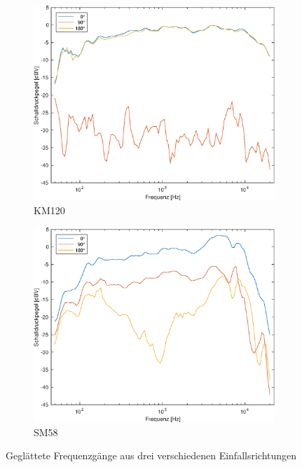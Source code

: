 \begin{figure}[bth]
    \centering
    \begin{subfigure}{.5\textwidth}
        \centering
        \caption{KM120}
        \includegraphics[width=0.95\linewidth]{Figures/km120_all}
    \end{subfigure}%
    \begin{subfigure}{.5\textwidth}
        \centering
        \caption{SM58}
        \includegraphics[width=0.95\linewidth]{Figures/sm58_all.eps}
    \end{subfigure}
    \caption{Geglättete Frequenzgänge aus drei verschiedenen Einfallsrichtungen}
    \label{fig:freq_all}
\end{figure}


